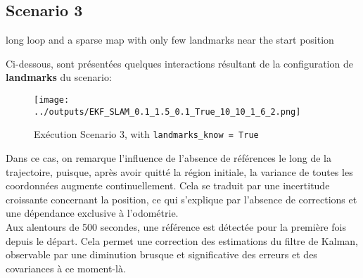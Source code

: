 \documentclass[../CSC_5RO12_TA_TP4.tex]{subfiles}
\begin{document}
\subsection{Scenario 3}
\begin{definition}
    long loop and a sparse map with only few landmarks near the start position
\end{definition}
\noindent Ci-dessous, sont présentées quelques interactions résultant de la configuration de \textbf{landmarks} du scenario:
\begin{figure}[H]
    \centering
	\texttt{[image: ../outputs/EKF\_SLAM\_0.1\_1.5\_0.1\_True\_10\_10\_1\_6\_2.png]}
	\caption{Exécution Scenario 3, with \texttt{landmarks\_know = True}}
	\label{}
\end{figure}
\noindent Dans ce cas, on remarque l'influence de l'absence de références le long de la trajectoire, puisque, après avoir quitté la région initiale, la variance de toutes les coordonnées augmente continuellement. Cela se traduit par une incertitude croissante concernant la position, ce qui s'explique par l'absence de corrections et une dépendance exclusive à l'odométrie.\\

\noindent Aux alentours de 500 secondes, une référence est détectée pour la première fois depuis le départ. Cela permet une correction des estimations du filtre de Kalman, observable par une diminution brusque et significative des erreurs et des covariances à ce moment-là.
\end{document}
